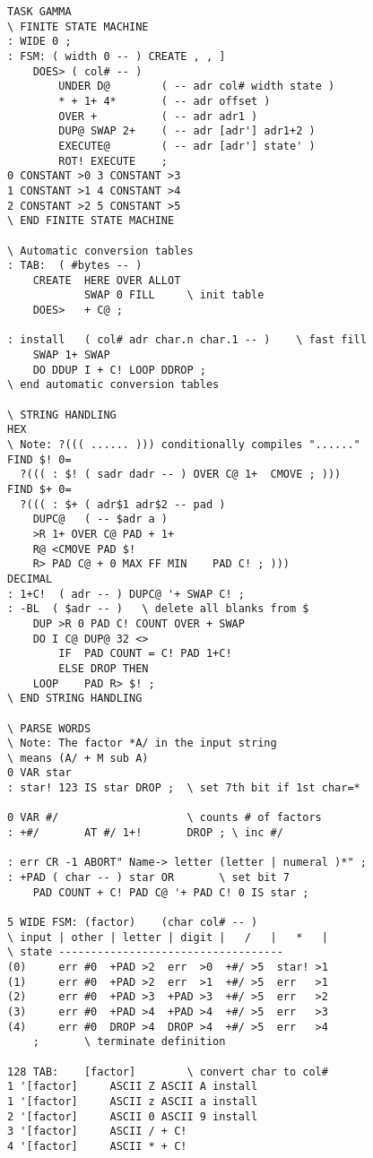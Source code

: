 \begin{lstlisting}
TASK GAMMA
\ FINITE STATE MACHINE
: WIDE 0 ;
: FSM: ( width 0 -- ) CREATE , , ]
    DOES> ( col# -- )
        UNDER D@        ( -- adr col# width state )
        * + 1+ 4*       ( -- adr offset )
        OVER +          ( -- adr adr1 )
        DUP@ SWAP 2+    ( -- adr [adr'] adr1+2 )
        EXECUTE@        ( -- adr [adr'] state' )
        ROT! EXECUTE    ;
0 CONSTANT >0 3 CONSTANT >3
1 CONSTANT >1 4 CONSTANT >4
2 CONSTANT >2 5 CONSTANT >5
\ END FINITE STATE MACHINE

\ Automatic conversion tables
: TAB:  ( #bytes -- )
    CREATE  HERE OVER ALLOT
            SWAP 0 FILL     \ init table
    DOES>   + C@ ;

: install   ( col# adr char.n char.1 -- )    \ fast fill
    SWAP 1+ SWAP
    DO DDUP I + C! LOOP DDROP ;
\ end automatic conversion tables

\ STRING HANDLING
HEX
\ Note: ?((( ...... ))) conditionally compiles "......"
FIND $! 0=
  ?((( : $! ( sadr dadr -- ) OVER C@ 1+  CMOVE ; )))
FIND $+ 0=
  ?((( : $+ ( adr$1 adr$2 -- pad )
    DUPC@   ( -- $adr a )
    >R 1+ OVER C@ PAD + 1+
    R@ <CMOVE PAD $!
    R> PAD C@ + 0 MAX FF MIN    PAD C! ; )))
DECIMAL
: 1+C!  ( adr -- ) DUPC@ '+ SWAP C! ;
: -BL  ( $adr -- )   \ delete all blanks from $
    DUP >R 0 PAD C! COUNT OVER + SWAP
    DO I C@ DUP@ 32 <>
        IF  PAD COUNT = C! PAD 1+C!
        ELSE DROP THEN
    LOOP    PAD R> $! ;
\ END STRING HANDLING

\ PARSE WORDS
\ Note: The factor *A/ in the input string
\ means (A/ + M sub A)
0 VAR star
: star! 123 IS star DROP ;  \ set 7th bit if 1st char=*

0 VAR #/                    \ counts # of factors
: +#/       AT #/ 1+!       DROP ; \ inc #/

: err CR -1 ABORT" Name-> letter (letter | numeral )*" ;
: +PAD ( char -- ) star OR       \ set bit 7
    PAD COUNT + C! PAD C@ '+ PAD C! 0 IS star ;
    
5 WIDE FSM: (factor)    (char col# -- )
\ input | other | letter | digit |   /   |   *   |
\ state -----------------------------------
(0)     err #0  +PAD >2  err  >0  +#/ >5  star! >1
(1)     err #0  +PAD >2  err  >1  +#/ >5  err   >1
(2)     err #0  +PAD >3  +PAD >3  +#/ >5  err   >2
(3)     err #0  +PAD >4  +PAD >4  +#/ >5  err   >3
(4)     err #0  DROP >4  DROP >4  +#/ >5  err   >4
    ;       \ terminate definition

128 TAB:    [factor]        \ convert char to col#
1 '[factor]     ASCII Z ASCII A install
1 '[factor]     ASCII z ASCII a install
2 '[factor]     ASCII 0 ASCII 9 install
3 '[factor]     ASCII / + C!
4 '[factor]     ASCII * + C!


\end{lstlisting}
